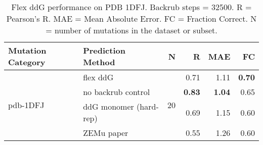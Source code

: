 \begin{table}
  \begin{tabular}{llrrrr}
\toprule
Mutation Category &       Prediction Method &   N &    R &  MAE &   FC \\
\midrule
 \multirow{ 4}{*}{pdb-1DFJ} & flex ddG & \multirow{ 4}{*}{20} & 0.71 & 1.11 & \textbf{0.70}  \\
 & no backrub control & & \textbf{0.83} & \textbf{1.04} & 0.65  \\
 & ddG monomer (hard-rep) & & 0.69 & 1.15 & 0.60  \\
 & ZEMu paper & & 0.55 & 1.26 & 0.60  \\
\bottomrule
\end{tabular}
  \caption[Flex ddG performance on PDB 1DFJ]{
    Flex ddG performance on PDB 1DFJ. Backrub steps = 32500. R = Pearson's R. MAE = Mean Absolute Error. FC = Fraction Correct. N = number of mutations in the dataset or subset.
  } \label{tab:table-pdb-1DFJ}
\end{table}
